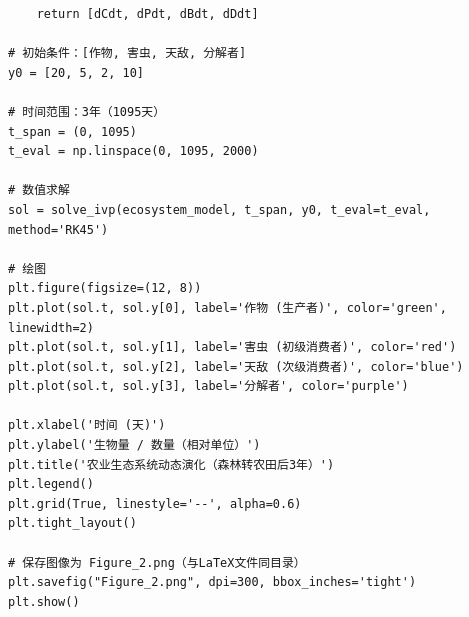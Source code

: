 \documentclass[12pt]{article}
\begin{document}
\begin{verbatim}
    return [dCdt, dPdt, dBdt, dDdt]

# 初始条件：[作物, 害虫, 天敌, 分解者]
y0 = [20, 5, 2, 10]

# 时间范围：3年（1095天）
t_span = (0, 1095)
t_eval = np.linspace(0, 1095, 2000)

# 数值求解
sol = solve_ivp(ecosystem_model, t_span, y0, t_eval=t_eval, method='RK45')

# 绘图
plt.figure(figsize=(12, 8))
plt.plot(sol.t, sol.y[0], label='作物 (生产者)', color='green', linewidth=2)
plt.plot(sol.t, sol.y[1], label='害虫 (初级消费者)', color='red')
plt.plot(sol.t, sol.y[2], label='天敌 (次级消费者)', color='blue')
plt.plot(sol.t, sol.y[3], label='分解者', color='purple')

plt.xlabel('时间 (天)')
plt.ylabel('生物量 / 数量（相对单位）')
plt.title('农业生态系统动态演化（森林转农田后3年）')
plt.legend()
plt.grid(True, linestyle='--', alpha=0.6)
plt.tight_layout()

# 保存图像为 Figure_2.png（与LaTeX文件同目录）
plt.savefig("Figure_2.png", dpi=300, bbox_inches='tight')
plt.show()
\end{verbatim}
\end{document}
